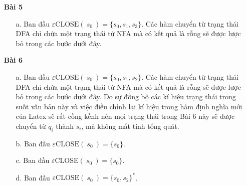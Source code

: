\documentclass[12pt, a4paper]{article}
\newcommand{\epsCLOSE}[1]{
	\varepsilon\text{CLOSE}\left(\ #1 \ \right)
}
\begin{document}
\begin{itemize}
\begin{itemize}
		\end{itemize}							
	
		\item[ \textbf{Bài 5} ]	
		
		\begin{itemize}
		
			\item[a.] Ban đầu $\epsCLOSE{s_0} = \{s_0, s_1, s_3\}$. Các hàm chuyển từ trạng thái DFA chỉ chứa một trạng thái từ NFA mà có kết quả là rỗng sẽ được lược bỏ trong các bước dưới đây.
			
			
		
		\end{itemize}
	
		\item[ \textbf{Bài 6} ]
		
		\begin{itemize}
			
			\item[a.] Ban đầu $\epsCLOSE{s_0} = \{s_0, s_1, s_2\}$. Các hàm chuyển từ trạng thái DFA chỉ chứa một trạng thái từ NFA mà có kết quả là rỗng sẽ được lược bỏ trong các bước dưới đây. Do sự đồng bộ các kí hiệu trạng thái trong suốt văn bản này và việc điều chỉnh lại kí hiệu trong hàm định nghĩa mới của Latex sẽ rất cồng kềnh nên mọi trạng thái trong Bài 6 này sẽ được chuyển từ $q_i$ thành $s_i$, mà không mất tính tổng quát.
			
			
			\item[b.] Ban đầu $\epsCLOSE{s_0} = \{s_0\}$.
			
			
			\item[c.] Ban đầu $\epsCLOSE{s_0} = \{s_0\}$.
			
			
			\item[d.] Ban đầu $\epsCLOSE{s_0} = \{s_0, s_2\}^*$.
			
			
		\end{itemize}			
	
	\end{itemize}
	
\end{document}
